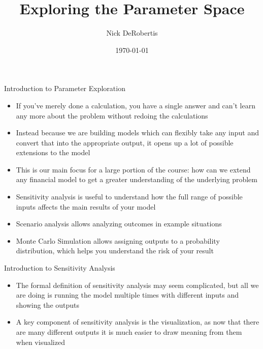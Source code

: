 \documentclass[]{article}
\begin{document}
\title{Exploring the Parameter Space}
\author{Nick DeRobertis}
\date{\today}
\maketitle
\begin{section}{Introduction to Parameter Exploration}
\begin{itemize}
\item If you've merely done a calculation, you have a single answer and can't learn any more about the problem without redoing the calculations
\item Instead because we are building models which can flexibly take any input and convert that into the appropriate output, it opens up a lot of possible extensions to the model
\item This is our main focus for a large portion of the course: how can we extend any financial model to get a greater understanding of the underlying problem
\item Sensitivity analysis is useful to understand how the full range of possible inputs affects the main results of your model
\item Scenario analysis allows analyzing outcomes in example situations
\item Monte Carlo Simulation allows assigning outputs to a probability distribution, which helps you understand the risk of your result
\end{itemize}
\end{section}
\begin{section}{Introduction to Sensitivity Analysis}
\begin{itemize}
\item The formal definition of sensitivity analysis may seem complicated, but all we are doing is running the model multiple times with different inputs and showing the outputs
\item A key component of sensitivity analysis is the visualization, as now that there are many different outputs it is much easier to draw meaning from them when visualized
\end{itemize}
\end{section}
\end{document}
